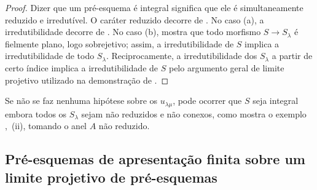 \begin{proof}
Dizer que um pré-esquema é integral significa que ele é simultaneamente reduzido e irredutível. O caráter reduzido decorre de . No caso (a), a irredutibilidade decorre de . No caso (b),  mostra que todo morfismo $S\to S_\lambda$ é fielmente plano, logo sobrejetivo; assim, a irredutibilidade de $S$ implica a irredutibilidade de todo $S_\lambda$. Reciprocamente, a irredutibilidade dos $S_\lambda$ a partir de certo índice implica a irredutibilidade de $S$ pelo argumento geral de limite projetivo utilizado na demonstração de .
\end{proof}

\begin{remark}[8.7.4]
\label{IV.8.7.4}
Se não se faz nenhuma hipótese sobre os $u_{\lambda\mu}$, pode ocorrer que $S$ seja integral embora todos os $S_\lambda$ sejam não reduzidos e não conexos, como mostra o exemplo ,~(ii), tomando o anel $A$ não reduzido.
\end{remark}

\subsection{Pré-esquemas de apresentação finita sobre um limite projetivo de pré-esquemas}
\label{subsection:IV.8.8}

